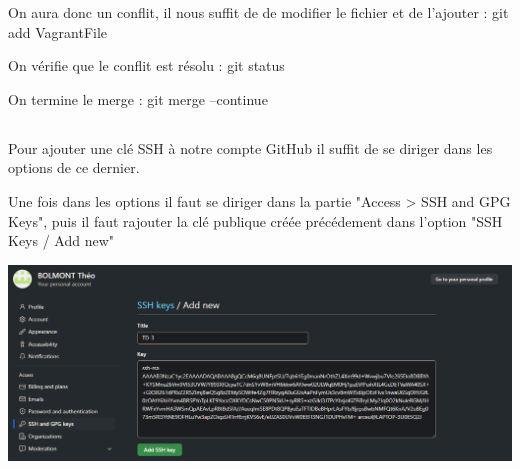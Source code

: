 \documentclass{article}
\begin{document}
On aura donc un conflit, il nous suffit de de modifier le fichier et de l'ajouter : git add VagrantFile

On vérifie que le conflit est résolu : git status

On termine le merge : git merge --continue 

\subsection{}

Pour ajouter une clé SSH à notre compte GitHub il suffit de se diriger dans les options de ce dernier.

Une fois dans les options il faut se diriger dans la partie "Access > SSH and GPG Keys", puis il faut rajouter la clé publique créée précédement dans l'option "SSH Keys / Add new"

\begin{center}
\includegraphics[scale=0.5]{image/SSH.png}
\end{center}
\end{document}

